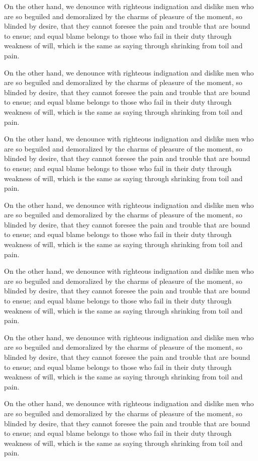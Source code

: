 On the other hand, we denounce with righteous indignation and dislike men who
are so beguiled and demoralized by the charms of pleasure of the moment, so
blinded by desire, that they cannot foresee the pain and trouble that are bound
to ensue; and equal blame belongs to those who fail in their duty through
weakness of will, which is the same as saying through shrinking from toil and
pain.

On the other hand, we denounce with righteous indignation and dislike men who
are so beguiled and demoralized by the charms of pleasure of the moment, so
blinded by desire, that they cannot foresee the pain and trouble that are bound
to ensue; and equal blame belongs to those who fail in their duty through
weakness of will, which is the same as saying through shrinking from toil and
pain.

On the other hand, we denounce with righteous indignation and dislike men who
are so beguiled and demoralized by the charms of pleasure of the moment, so
blinded by desire, that they cannot foresee the pain and trouble that are bound
to ensue; and equal blame belongs to those who fail in their duty through
weakness of will, which is the same as saying through shrinking from toil and
pain.

On the other hand, we denounce with righteous indignation and dislike men who
are so beguiled and demoralized by the charms of pleasure of the moment, so
blinded by desire, that they cannot foresee the pain and trouble that are bound
to ensue; and equal blame belongs to those who fail in their duty through
weakness of will, which is the same as saying through shrinking from toil and
pain.

On the other hand, we denounce with righteous indignation and dislike men who
are so beguiled and demoralized by the charms of pleasure of the moment, so
blinded by desire, that they cannot foresee the pain and trouble that are bound
to ensue; and equal blame belongs to those who fail in their duty through
weakness of will, which is the same as saying through shrinking from toil and
pain.

On the other hand, we denounce with righteous indignation and dislike men who
are so beguiled and demoralized by the charms of pleasure of the moment, so
blinded by desire, that they cannot foresee the pain and trouble that are bound
to ensue; and equal blame belongs to those who fail in their duty through
weakness of will, which is the same as saying through shrinking from toil and
pain.

On the other hand, we denounce with righteous indignation and dislike men who
are so beguiled and demoralized by the charms of pleasure of the moment, so
blinded by desire, that they cannot foresee the pain and trouble that are bound
to ensue; and equal blame belongs to those who fail in their duty through
weakness of will, which is the same as saying through shrinking from toil and
pain.


